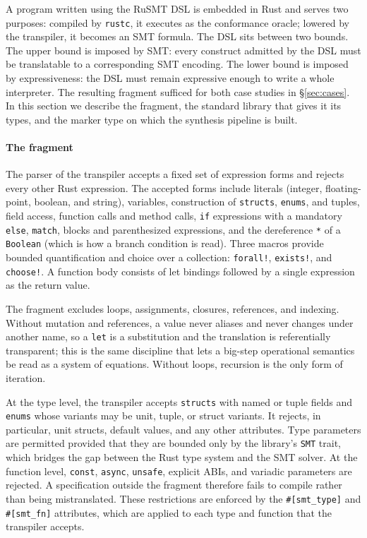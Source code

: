 \documentclass[sigconf,screen]{acmart}
\theoremstyle{definition}
\theoremstyle{remark}
\newcommand{\rusmt}{RuSMT}
\newcommand{\code}[1]{\texttt{#1}}
\begin{document}
A program written using the \rusmt{} DSL is embedded in Rust and serves two purposes: compiled by \code{rustc}, it executes as the conformance oracle; lowered by the transpiler, it becomes an SMT formula. The DSL sits between two bounds. The upper bound is imposed by SMT: every construct admitted by the DSL must be translatable to a corresponding SMT encoding. The lower bound is imposed by expressiveness: the DSL must remain expressive enough to write a whole interpreter. The resulting fragment sufficed for both case studies in \S\ref{sec:cases}. In this section we describe the
fragment, the standard library that gives it its types, and the marker type on
which the synthesis pipeline is built.

\paragraph{The fragment}
The parser of the transpiler accepts a fixed set of expression forms and
rejects every other Rust expression. The
accepted forms include literals (integer, floating-point, boolean, and string),
variables, construction of \code{structs}, \code{enums}, and tuples, field access, function calls and method calls, \code{if} expressions with a
mandatory \code{else}, \code{match}, blocks and parenthesized expressions, and the
dereference \code{*} of a \code{Boolean} (which is how a branch condition is
read). Three macros provide bounded quantification and choice over a collection: \code{forall!},
\code{exists!}, and \code{choose!}. A function body consists of let bindings followed by a single expression as the return value.

The fragment excludes loops, assignments, closures, references, and indexing. Without
mutation and references, a value never aliases and never changes under another
name, so a \code{let} is a substitution and the translation is referentially
transparent; this is the same discipline that lets a big-step operational
semantics be read as a system of equations. Without loops, recursion is the only form of iteration.

At the type level, the transpiler accepts \code{structs} with named or
tuple fields and \code{enums} whose variants may be unit, tuple, or struct
variants. It rejects, in particular, unit structs, default values, and any other attributes. 
Type parameters are permitted provided that they are bounded only by the
library's \code{SMT} trait, which bridges the gap between the Rust type system and the SMT solver.
At the function level, \code{const},
\code{async}, \code{unsafe}, explicit ABIs, and variadic parameters are rejected. 
A specification outside the fragment therefore fails to compile rather than being mistranslated. These restrictions are enforced by the \code{\#[smt\_type]} and \code{\#[smt\_fn]} attributes, which are applied to each type and function that the transpiler accepts.
\end{document}
